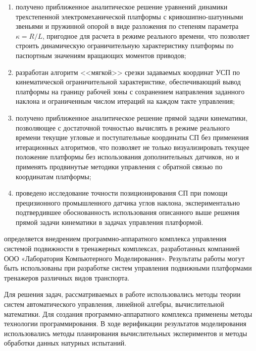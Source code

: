 {\novelty}
\begin{enumerate}
  \item получено приближенное аналитическое решение уравнений динамики трехстепенной электромеханической платформы с кривошипно-шатунными звеньями и пружинной опорой в виде разложения по степеням параметра $\kappa = R/L$, пригодное для расчета в режиме реального времени, что позволяет строить динамическую ограничительную характеристику платформы по паспортным значениям вращающих моментов приводов;
  \item разработан алгоритм <<мягкой>> срезки задаваемых координат УСП по кинематической ограничительной характеристике, обеспечивающий вывод платформы на границу рабочей зоны с сохранением направления заданного наклона и ограниченным числом итераций на каждом такте управления;
  \item получено приближенное аналитическое решение прямой задачи кинематики, позволяющее с достаточной точностью вычислять в режиме реального времени текущие угловые и поступательные координаты СП без применения итерационных алгоритмов, что позволяет не только визуализировать текущее положение платформы без использования дополнительных датчиков, но и применять продвинутые методики управления с обратной связью по координатам платформы;
  \item проведено исследование точности позиционирования СП при помощи прецизионного промышленного датчика углов наклона, экспериментально подтвердившее обоснованность использования описанного выше решения прямой задачи кинематики в задачах управления платформой.
\end{enumerate}

{\influence} определяется внедрением программно-аппаратного комплекса управления системой подвижности в тренажерных комплексах, разработанных компанией ООО «Лаборатория Компьютерного Моделирования». Результаты работы могут быть использованы при разработке систем управления подвижными платформами тренажеров различных видов транспорта.

{\methods} Для решения задач, рассматриваемых в работе использовались методы теории систем автоматического управления, линейной алгебры, вычислительной математики. Для создания программно-аппаратного комплекса применены методы технологии программирования. В ходе верификации результатов моделирования использовались методы планирования вычислительных экспериментов и методы обработки данных натурных испытаний.

